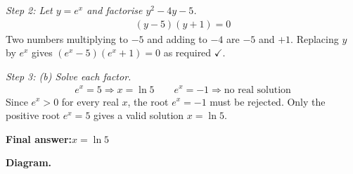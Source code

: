 \documentclass[11pt]{article}
\begin{document}
\textit{Step 2: Let \( y = e^x \) and factorise \( y^2 - 4y - 5 \).}
\[\begin{gathered}
(y-5)(y+1) = 0
\end{gathered}\]
Two numbers multiplying to \( -5 \) and adding to \( -4 \) are \( -5 \) and \( +1 \). Replacing \( y \) by \( e^x \) gives \( (e^x - 5)(e^x + 1) = 0 \) as required $\checkmark$.

\textit{Step 3: (b) Solve each factor.}
\[\begin{gathered}
e^x = 5 \Rightarrow x = \ln 5 \qquad e^x = -1 \Rightarrow \text{no real solution}
\end{gathered}\]
Since \( e^x > 0 \) for every real \( x \), the root \( e^x = -1 \) must be rejected. Only the positive root \( e^x = 5 \) gives a valid solution \( x = \ln 5 \).

\begin{answerbox}
\textbf{Final answer:}\quad \(\displaystyle  x = \ln 5 \)
\end{answerbox}
\textbf{Diagram.}
\end{document}
